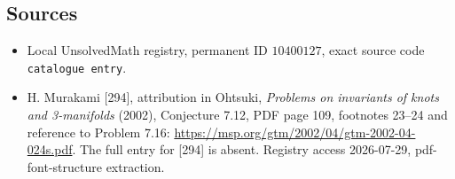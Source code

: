 \documentclass[11pt]{article}
\begin{document}
\subsection{Sources}
\begin{itemize}
\item Local UnsolvedMath registry, permanent ID \(10400127\), exact source code \texttt{catalogue entry}.
\item H. Murakami [294], attribution in Ohtsuki, \emph{Problems on invariants of knots and 3-manifolds} (2002), Conjecture 7.12, PDF page 109, footnotes 23--24 and reference to Problem 7.16: \url{https://msp.org/gtm/2002/04/gtm-2002-04-024s.pdf}. The full entry for [294] is absent. Registry access 2026-07-29, pdf-font-structure extraction.
\end{itemize}
\end{document}
